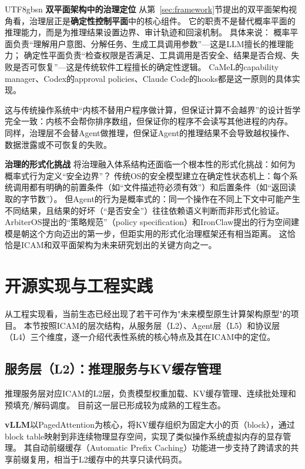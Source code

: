 \documentclass[11pt,a4paper]{article}
\begin{document}
\begin{CJK*}{UTF8}{gbsn}
\textbf{双平面架构中的治理定位}
从第~\ref{sec:framework}节提出的双平面架构视角看，治理层正是\textbf{确定性控制平面}中的核心组件。
它的职责不是替代概率平面的推理能力，而是为推理结果设置边界、审计轨迹和回滚机制。
具体来说：
概率平面负责``理解用户意图、分解任务、生成工具调用参数''---这是LLM擅长的推理能力；
确定性平面负责``检查权限是否满足、工具调用是否安全、结果是否合规、失败是否可恢复''---这是传统软件工程擅长的确定性逻辑。
CaMeL\cite{debenedetti2025camel}的capability manager、Codex\cite{openai_codex_approvals_2026}的approval policies、Claude Code\cite{anthropic_claudecode_security_2026}的hooks都是这一原则的具体实现。

这与传统操作系统中``内核不替用户程序做计算，但保证计算不会越界''的设计哲学完全一致\cite{ostep_2023}：内核不会帮你排序数组，但保证你的程序不会读写其他进程的内存。
同样，治理层不会替Agent做推理，但保证Agent的推理结果不会导致越权操作、数据泄露或不可恢复的失败。

\textbf{治理的形式化挑战}
将治理融入体系结构还面临一个根本性的形式化挑战：如何为概率式行为定义``安全边界''？
传统OS的安全模型建立在确定性状态机上：每个系统调用都有明确的前置条件（如``文件描述符必须有效''）和后置条件（如``返回读取的字节数''）。
但Agent的行为是概率式的：同一个操作在不同上下文中可能产生不同结果，且结果的好坏（``是否安全''）往往依赖语义判断而非形式化验证。
ArbiterOS\cite{arbiteros2025}提出的``策略规范''（policy specification）和IronClaw\cite{ironclaw2025}提出的行为空间建模是朝这个方向迈出的第一步，但距实用的形式化治理框架还有相当距离。
这恰恰是ICAM和双平面架构为未来研究划出的关键方向之一。%
\section{开源实现与工程实践}
\label{sec:implementation}

从工程实现看，当前生态已经出现了若干可作为"未来模型原生计算架构原型"的项目。
本节按照ICAM的层次结构，从服务层（L2）、Agent层（L5）和协议层（L4）三个维度，逐一介绍代表性系统的核心特点及其在ICAM中的定位。

\subsection{服务层（L2）：推理服务与KV缓存管理}

推理服务层对应ICAM的L2层，负责模型权重加载、KV缓存管理、连续批处理和预填充/解码调度。
目前这一层已形成较为成熟的工程生态。

\textbf{vLLM}以PagedAttention为核心，将KV缓存组织为固定大小的页（block），通过block table映射到非连续物理显存空间，实现了类似操作系统虚拟内存的显存管理\cite{kwon2023pagedattention,vllm_docs_2026}。
其自动前缀缓存（Automatic Prefix Caching）功能进一步支持了跨请求的共享前缀复用，相当于L2缓存中的共享只读代码页\cite{vllm_prefix_2026}。


\end{CJK*}
\end{document}
